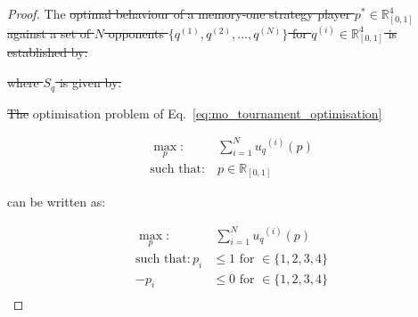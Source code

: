 \documentclass[10pt]{article}
\newcommand{\R}{\mathbb{R}}
\providecommand{\DIFdeltex}[1]{{\protect\color{red}\sout{#1}}}                      %
\providecommand{\DIFdelbegin}{} %
\providecommand{\DIFdelend}{} %
\providecommand{\DIFdel}[1]{\texorpdfstring{\DIFdeltex{#1}}{}} %
\newcommand{\DIFscaledelfig}{0.5}
\newlength{\DIFdelgraphicswidth} %
\newlength{\DIFdelgraphicsheight} %
\newcommand{\DIFdelincludegraphics}[2][]{%
\sbox{\DIFdelgraphicsbox}{\DIFOincludegraphics[#1]{#2}}%
\settoboxwidth{\DIFdelgraphicswidth}{\DIFdelgraphicsbox} %
\settoboxtotalheight{\DIFdelgraphicsheight}{\DIFdelgraphicsbox} %
\scalebox{\DIFscaledelfig}{%
\parbox[b]{\DIFdelgraphicswidth}{\usebox{\DIFdelgraphicsbox}\\[-\baselineskip] \rule{\DIFdelgraphicswidth}{0em}}\llap{\resizebox{\DIFdelgraphicswidth}{\DIFdelgraphicsheight}{%
\setlength{\unitlength}{\DIFdelgraphicswidth}%
\begin{picture}(1,1)%
\thicklines\linethickness{2pt} %
{\color[rgb]{1,0,0}\put(0,0){\framebox(1,1){}}}%
{\color[rgb]{1,0,0}\put(0,0){\line( 1,1){1}}}%
{\color[rgb]{1,0,0}\put(0,1){\line(1,-1){1}}}%
\end{picture}%
}\hspace*{3pt}}} %
} %
\DeclareRobustCommand{\DIFdelbegin}{\DIFOdelbegin \let\includegraphics\DIFdelincludegraphics} %
\DeclareRobustCommand{\DIFdelend}{\DIFOaddend \let\includegraphics\DIFOincludegraphics} %
\begin{document}
\DIFdelend \begin{proof}
    The \DIFdelbegin \DIFdel{optimal behaviour of a memory-one strategy player
    \(p^* \in \R_{[0, 1]} ^ 4\)
    against a set of \(N\) opponents \(\{q^{(1)}, q^{(2)}, \dots, q^{(N)} \}\)
    for \(q^{(i)} \in \R_{[0, 1]} ^ 4\) is established by:
    }%


\DIFdel{where \(S_q\) is given by:
    }%

\DIFdel{The }\DIFdelend optimisation problem of Eq.~\ref{eq:mo_tournament_optimisation}

    \begin{equation}\label{eq:mo_tournament_optimisation}
        \begin{aligned}
        \max_p: & \ \sum_{i=1} ^ {N} {u_q}^{(i)} (p)
        \\
        \text{such that}: & \ p \in \R_{[0, 1]}
        \end{aligned}
    \end{equation}

    can be written as:

    \begin{equation}\label{eq:mo_tournament_optimisation_standard}
        \begin{aligned}
        \max_p: & \ \sum_{i=1} ^ {N} {u_q}^{(i)} (p)
        \\
        \text{such that}: p_i & \leq 1 \text{ for } \in \{1, 2, 3, 4\} \\
        - p_i & \leq 0 \text{ for } \in \{1, 2, 3, 4\} \\
        \end{aligned}
    \end{equation}


\end{proof}
\end{document}
